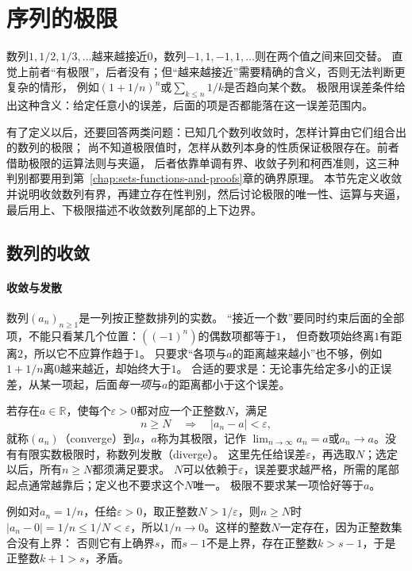 \section{序列的极限}
\label{sec:analysis-continuous-limits}

数列$1,1/2,1/3,\ldots$越来越接近$0$，数列$-1,1,-1,1,\ldots$则在两个值之间来回交替。
直觉上前者“有极限”，后者没有；但“越来越接近”需要精确的含义，否则无法判断更复杂的情形，
例如$(1+1/n)^n$或$\sum_{k\leq n}1/k$是否趋向某个数。
极限用误差条件给出这种含义：给定任意小的误差，后面的项是否都能落在这一误差范围内。

\label{sec:analysis-sequences-series-errors}

有了定义以后，还要回答两类问题：已知几个数列收敛时，怎样计算由它们组合出的数列的极限；
尚不知道极限值时，怎样从数列本身的性质保证极限存在。前者借助极限的运算法则与夹逼，
后者依靠单调有界、收敛子列和柯西准则，这三种判别都要用到第~\ref{chap:sets-functions-and-proofs}章的确界原理。
本节先定义收敛并说明收敛数列有界，再建立存在性判别，然后讨论极限的唯一性、运算与夹逼，
最后用上、下极限描述不收敛数列尾部的上下边界。

\subsection{数列的收敛}

\paragraph{收敛与发散}
数列$(a_n)_{n\geq1}$是一列按正整数排列的实数。
“接近一个数”要同时约束后面的全部项，不能只看某几个位置：$((-1)^n)$的偶数项都等于$1$，
但奇数项始终离$1$有距离$2$，所以它不应算作趋于$1$。
只要求“各项与$a$的距离越来越小”也不够，例如$1+1/n$离$0$越来越近，却始终大于$1$。
合适的要求是：无论事先给定多小的正误差，从某一项起，后面\emph{每一项}与$a$的距离都小于这个误差。

若存在$a\in\mathbb R$，使每个$\varepsilon>0$都对应一个正整数$N$，满足
\[
 n\geq N\quad\Longrightarrow\quad |a_n-a|<\varepsilon,
\]
就称$(a_n)$（converge）到$a$，$a$称为其极限，记作
$\lim_{n\to\infty}a_n=a$或$a_n\to a$。没有有限实数极限时，称数列发散（diverge）。
这里先任给误差$\varepsilon$，再选取$N$；选定以后，所有$n\geq N$都须满足要求。
$N$可以依赖于$\varepsilon$，误差要求越严格，所需的尾部起点通常越靠后；定义也不要求这个$N$唯一。
极限不要求某一项恰好等于$a$。

例如对$a_n=1/n$，任给$\varepsilon>0$，取正整数$N>1/\varepsilon$，则$n\geq N$时
$|a_n-0|=1/n\leq1/N<\varepsilon$，所以$1/n\to0$。这样的整数$N$一定存在，因为正整数集合没有上界：
否则它有上确界$s$，而$s-1$不是上界，存在正整数$k>s-1$，于是正整数$k+1>s$，矛盾。

